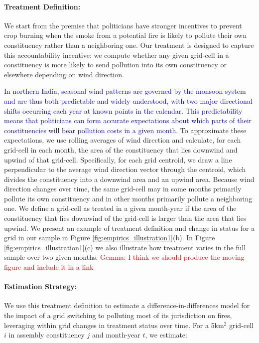 \documentclass[12pt]{article}
\begin{document}
\paragraph{Treatment Definition:} 
We start from the premise that politicians have stronger incentives to prevent crop burning when the smoke from a potential fire is likely to pollute their own constituency rather than a neighboring one. Our treatment is designed to capture this accountability incentive: we compute whether any given grid-cell in a constituency is more likely to send pollution into its own constituency or elsewhere depending on wind direction. 

\textcolor{blue}{In northern India, seasonal wind patterns are governed by the monsoon system and are thus both predictable and widely understood, with two major directional shifts occurring each year at known points in the calendar. This predictability means that politicians can form accurate expectations about which parts of their constituencies will bear pollution costs in a given month.}
To approximate these expectations, we use rolling averages of wind direction and calculate, for each grid-cell in each month, the area of the constituency that lies downwind and upwind of that grid-cell. Specifically, for each grid centroid, we draw a line perpendicular to the average wind direction vector through the centroid, which divides the constituency into a downwind area and an upwind area.
Because wind direction changes over time, the same grid-cell may in some months primarily pollute its own constituency and in other months primarily pollute a neighboring one. We define a grid-cell as treated in a given month-year if the area of the constituency that lies downwind of the grid-cell is larger than the area that lies upwind. We present an example of treatment definition and change in status for a grid in our sample in Figure \ref{fig:empirics_illustration1}(b). In Figure \ref{fig:empirics_illustration1}(c) we also illustrate how treatment varies in the full sample over two given months. \textcolor{red}{Gemma: I think we should produce the moving figure and include it in a link}

\paragraph{Estimation Strategy:}
We use this treatment definition to estimate a difference-in-differences model for the impact of a grid switching to polluting most of its jurisdiction on fires, leveraging within grid changes in treatment status over time. For a 5km$^2$ grid-cell $i$ in assembly constituency $j$ and month-year $t$, we estimate:
\end{document}
